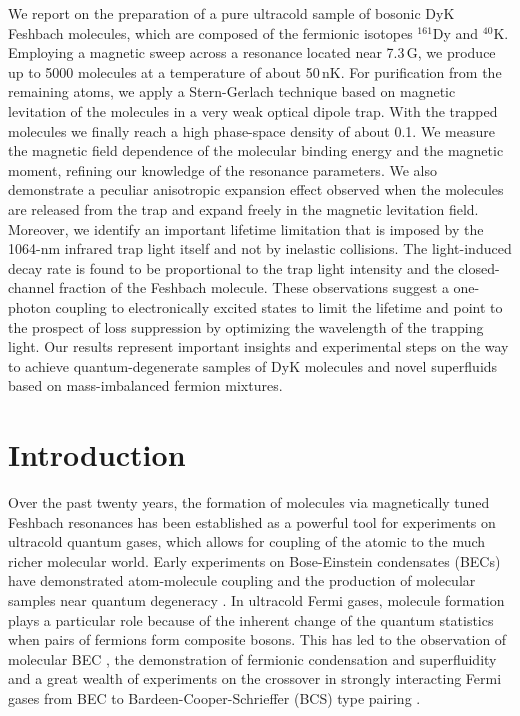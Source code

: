 \newpage
\begin{minipage}{10cm}
We report on the preparation of a pure ultracold sample of bosonic DyK Feshbach molecules, which are composed of the fermionic isotopes $^{161}$Dy and $^{40}$K. Employing a magnetic sweep across a resonance located near 7.3\,G, we produce up to 5000 molecules at a temperature of about 50\,nK. For purification from the remaining atoms, we apply a Stern-Gerlach technique based on magnetic levitation of the molecules in a very weak optical dipole trap. With the trapped molecules we finally reach a high phase-space density of about 0.1. We measure the magnetic field dependence of the molecular binding energy and the magnetic moment, refining our knowledge of the resonance parameters. We also demonstrate a peculiar anisotropic expansion effect observed when the molecules are released from the trap and expand freely in the magnetic levitation field. Moreover, we identify an important lifetime limitation that is imposed by the 1064-nm infrared trap light itself and not by inelastic collisions. The light-induced decay rate is found to be proportional to the trap light intensity and the closed-channel fraction of the Feshbach molecule. These observations suggest a one-photon coupling to electronically excited states to limit the lifetime and point to the prospect of loss suppression by optimizing the wavelength of the trapping light. Our results represent important insights and experimental steps on the way to achieve quantum-degenerate samples of DyK molecules and novel superfluids based on mass-imbalanced fermion mixtures.
\end{minipage}



\section{Introduction}\label{sec:Intro}

Over the past twenty years, the formation of molecules via magnetically tuned Feshbach resonances \cite{Koehler2006poc, Chin2010fri} has been established as a powerful tool for experiments on ultracold quantum gases, which allows for coupling of the atomic to the much richer molecular world.
Early experiments on Bose-Einstein condensates (BECs) have demonstrated
atom-molecule coupling \cite{Wynar2000mia, Donley2002amc} and the production of molecular samples near quantum degeneracy \cite{Herbig2003poa, Xu2003foq, Duerr2004oom}. In ultracold Fermi gases, molecule formation \cite{Regal2003cou, Strecker2003coa, Cubizolles2003pol, Jochim2003pgo} plays a particular role because of the inherent change of the quantum statistics when pairs of fermions form composite bosons. 
This has led to the observation of molecular BEC \cite{Jochim2003bec, Greiner2003eoa, Zwierlein2003oob}, the demonstration of fermionic condensation \cite{Regal2004oor} and superfluidity \cite{Zwierlein2005vas} and a great wealth of experiments on the crossover in strongly interacting Fermi gases from BEC to Bardeen-Cooper-Schrieffer (BCS) type pairing \cite{Zwerger2012tbb,Strinati2018tbb}.

